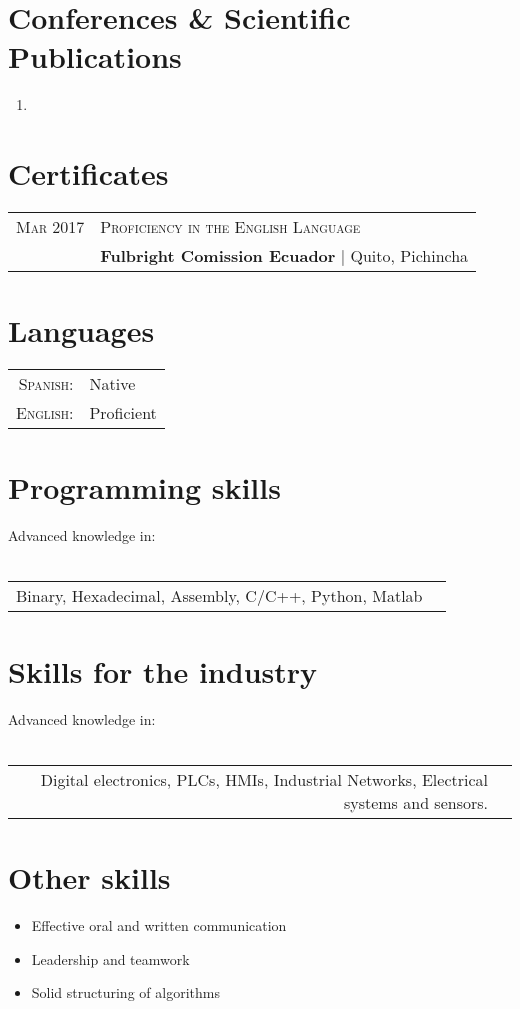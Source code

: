 \documentclass[a4paper,10.9pt]{article}
\begin{document}
\section{Conferences \& Scientific Publications}
\begin{enumerate}
	\item {}
\end{enumerate}

\section{Certificates}
\begin{tabular}{r|l}	
 \textsc{Mar} 2017 &  \textsc{Proficiency in the English Language}\\&
 \textbf{Fulbright Comission Ecuador} | Quito, Pichincha\\

\end{tabular}

\section{Languages}
\begin{tabular}{rl}
 \textsc{Spanish:}&Native\\
\textsc{English:}&Proficient\\
\end{tabular}

\section{Programming skills}
Advanced knowledge in:\\
\\
\begin{tabular}{rl}
Binary, Hexadecimal, Assembly, C/C++, Python, Matlab\\
\end{tabular}

\section{Skills for the industry}
Advanced knowledge in:\\
\\
\begin{tabular}{rl}
Digital electronics, PLCs, HMIs, Industrial Networks, Electrical systems and sensors.\\
\end{tabular}


\section{Other skills}

\begin{itemize}
	\item Effective oral and written communication

\item Leadership and teamwork

\item Solid structuring of algorithms
\end{itemize}
\end{document}

